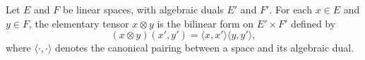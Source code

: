 Let $E$ and $F$ be linear spaces, with algebraic duals $E'$ and $F'$. For each $x \in E$ and $y \in F$, the elementary tensor $x \otimes y$ is the bilinear form on $E' \times F'$ defined by
$$(x \otimes y)(x', y') = \langle x, x' \rangle \langle y, y' \rangle,$$
where $\langle \cdot, \cdot \rangle$ denotes the canonical pairing between a space and its algebraic dual.
